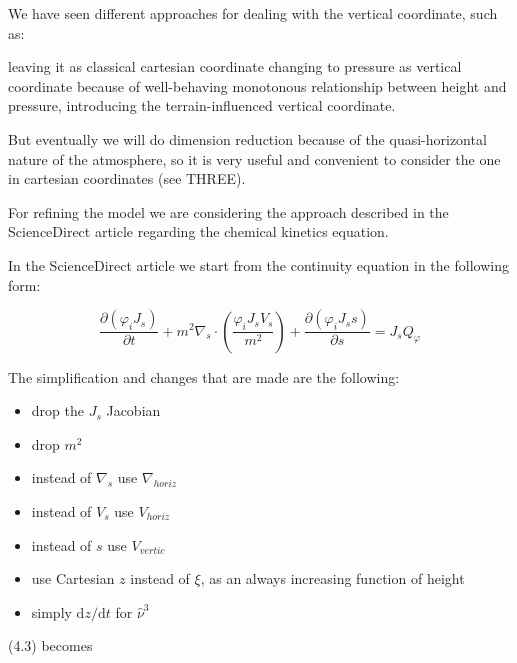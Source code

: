 \documentclass{article}
\begin{document}
We have seen different approaches for dealing with the vertical coordinate, such as:
\begin{outline}[enumerate]
\1 leaving it as classical cartesian coordinate
\1 changing to pressure as vertical coordinate because of well-behaving monotonous relationship between height and pressure,
\1 introducing the terrain-influenced vertical coordinate.
\end{outline}

But eventually we will do dimension reduction because of the quasi-horizontal nature of the atmosphere, so it is very useful and convenient to consider the one in cartesian coordinates (see THREE).

For refining the model we are considering the approach described in the ScienceDirect article regarding the chemical kinetics equation.


In the ScienceDirect article we start from the continuity equation in the following form:

\[ \frac{\partial( \varphi_i J_s)}{\partial t} + m^2 \nabla_s \cdot (\frac{\varphi_i J_s V_s}{m^2}) + \frac{\partial(\varphi_i J_s s)}{\partial s} = J_s Q_{\varphi}\]

The simplification and changes that are made are the following:

\begin{itemize}
  \item[$\square$]  drop the $J_s$ Jacobian
  \item[$\square$]  drop $m^2$
  \item[$\square$]  instead of $\nabla_s$ use $\nabla_{horiz}$
  \item[$\square$]  instead of $V_s$ use $V_{horiz}$
  \item[$\square$]  instead of $s$ use $V_{vertic}$
  \item[$\square$]  use Cartesian $z$ instead of $\xi$, as an always increasing function of height
  \item[$\square$]  simply $\mathrm{d}z / \mathrm{d} t$ for $\hat{\nu}^3$
\end{itemize}

(4.3) becomes
\end{document}
